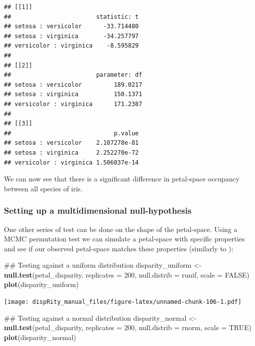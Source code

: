 \documentclass[]{book}
\newenvironment{Shaded}{\begin{snugshade}}{\end{snugshade}}
\newcommand{\KeywordTok}[1]{\textcolor[rgb]{0.13,0.29,0.53}{\textbf{#1}}}
\newcommand{\DataTypeTok}[1]{\textcolor[rgb]{0.13,0.29,0.53}{#1}}
\newcommand{\DecValTok}[1]{\textcolor[rgb]{0.00,0.00,0.81}{#1}}
\newcommand{\StringTok}[1]{\textcolor[rgb]{0.31,0.60,0.02}{#1}}
\newcommand{\OtherTok}[1]{\textcolor[rgb]{0.56,0.35,0.01}{#1}}
\newcommand{\NormalTok}[1]{#1}
\theoremstyle{definition}
\theoremstyle{definition}
\theoremstyle{remark}
\begin{document}
\begin{verbatim}
## [[1]]
##                        statistic: t
## setosa : versicolor      -33.714480
## setosa : virginica       -34.257797
## versicolor : virginica    -8.595829
## 
## [[2]]
##                        parameter: df
## setosa : versicolor         189.0217
## setosa : virginica          150.1371
## versicolor : virginica      171.2387
## 
## [[3]]
##                             p.value
## setosa : versicolor    2.107278e-81
## setosa : virginica     2.252270e-72
## versicolor : virginica 1.506037e-14
\end{verbatim}

We can now see that there is a significant difference in petal-space
occupancy between all species of iris.

\subsubsection{Setting up a multidimensional
null-hypothesis}\label{setting-up-a-multidimensional-null-hypothesis}

One other series of test can be done on the shape of the petal-space.
Using a MCMC permutation test we can simulate a petal-space with
specific properties and see if our observed petal-space matches these
properties (similarly to \citet{diaz2016global}):

\begin{Shaded}
\begin{Highlighting}[]
\NormalTok{## Testing against a uniform distribution}
\NormalTok{disparity_uniform <-}\StringTok{ }\KeywordTok{null.test}\NormalTok{(petal_disparity, }\DataTypeTok{replicates =} \DecValTok{200}\NormalTok{,}
    \DataTypeTok{null.distrib =}\NormalTok{ runif, }\DataTypeTok{scale =} \OtherTok{FALSE}\NormalTok{)}
\KeywordTok{plot}\NormalTok{(disparity_uniform)}
\end{Highlighting}
\end{Shaded}

\texttt{[image: dispRity\_manual\_files/figure-latex/unnamed-chunk-106-1.pdf]}

\begin{Shaded}
\begin{Highlighting}[]
\NormalTok{## Testing against a normal distribution}
\NormalTok{disparity_normal <-}\StringTok{ }\KeywordTok{null.test}\NormalTok{(petal_disparity, }\DataTypeTok{replicates =} \DecValTok{200}\NormalTok{,}
    \DataTypeTok{null.distrib =}\NormalTok{ rnorm, }\DataTypeTok{scale =} \OtherTok{TRUE}\NormalTok{)}
\KeywordTok{plot}\NormalTok{(disparity_normal)}
\end{Highlighting}
\end{Shaded}
\end{document}
